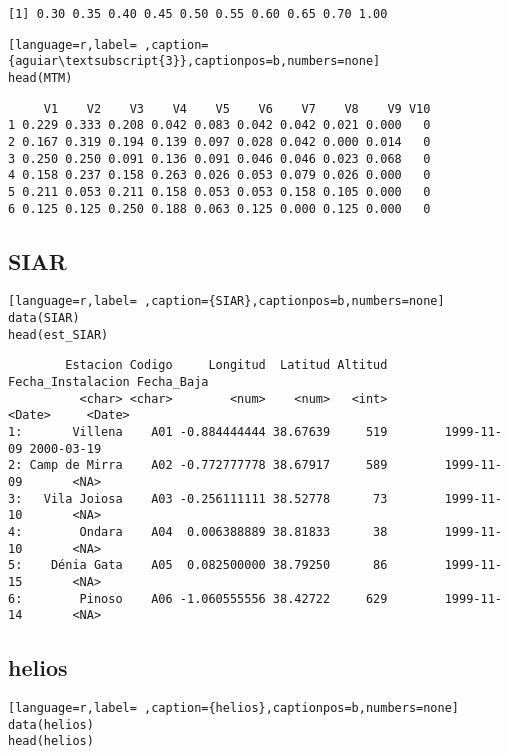 \begin{verbatim}
[1] 0.30 0.35 0.40 0.45 0.50 0.55 0.60 0.65 0.70 1.00
\end{verbatim}


\begin{lstlisting}[language=r,label= ,caption={aguiar\textsubscript{3}},captionpos=b,numbers=none]
head(MTM)
\end{lstlisting}

\begin{verbatim}
     V1    V2    V3    V4    V5    V6    V7    V8    V9 V10
1 0.229 0.333 0.208 0.042 0.083 0.042 0.042 0.021 0.000   0
2 0.167 0.319 0.194 0.139 0.097 0.028 0.042 0.000 0.014   0
3 0.250 0.250 0.091 0.136 0.091 0.046 0.046 0.023 0.068   0
4 0.158 0.237 0.158 0.263 0.026 0.053 0.079 0.026 0.000   0
5 0.211 0.053 0.211 0.158 0.053 0.053 0.158 0.105 0.000   0
6 0.125 0.125 0.250 0.188 0.063 0.125 0.000 0.125 0.000   0
\end{verbatim}

\subsection{SIAR}
\label{sec:org92f7d83}
\label{subsec:siar}
\begin{lstlisting}[language=r,label= ,caption={SIAR},captionpos=b,numbers=none]
data(SIAR)
head(est_SIAR)
\end{lstlisting}

\begin{verbatim}
        Estacion Codigo     Longitud  Latitud Altitud Fecha_Instalacion Fecha_Baja
          <char> <char>        <num>    <num>   <int>            <Date>     <Date>
1:       Villena    A01 -0.884444444 38.67639     519        1999-11-09 2000-03-19
2: Camp de Mirra    A02 -0.772777778 38.67917     589        1999-11-09       <NA>
3:   Vila Joiosa    A03 -0.256111111 38.52778      73        1999-11-10       <NA>
4:        Ondara    A04  0.006388889 38.81833      38        1999-11-10       <NA>
5:    Dénia Gata    A05  0.082500000 38.79250      86        1999-11-15       <NA>
6:        Pinoso    A06 -1.060555556 38.42722     629        1999-11-14       <NA>
\end{verbatim}

\subsection{helios}
\label{sec:org4cc4512}
\label{subsec:helios}
\begin{lstlisting}[language=r,label= ,caption={helios},captionpos=b,numbers=none]
data(helios)
head(helios)
\end{lstlisting}

